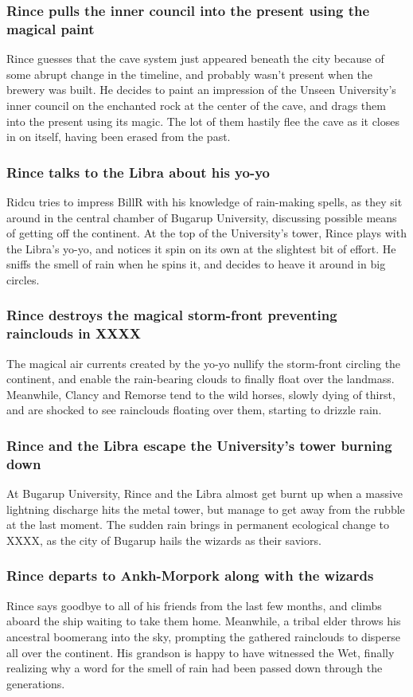 \subsubsection{\Gls{Rince} pulls the inner council into the present using the magical paint}
\Gls{Rince} guesses that the cave system just appeared beneath the city because of some abrupt
change in the timeline, and probably wasn't present when the brewery was built. He decides to paint
an impression of the Unseen University's inner council on the enchanted rock at the center of the
cave, and drags them into the present using its magic. The lot of them hastily flee the cave as it
closes in on itself, having been erased from the past.

\subsubsection{\Gls{Rince} talks to the \Gls{Libra} about his yo-yo}
\Gls{Ridcu} tries to impress \Gls{BillR} with his knowledge of rain-making spells, as they sit
around in the central chamber of Bugarup University, discussing possible means of getting off the
continent. At the top of the University's tower, \Gls{Rince} plays with the \Gls{Libra}'s yo-yo,
and notices it spin on its own at the slightest bit of effort. He sniffs the smell of rain when he
spins it, and decides to heave it around in big circles.

\subsubsection{\Gls{Rince} destroys the magical storm-front preventing rainclouds in XXXX}
The magical air currents created by the yo-yo nullify the storm-front circling the continent, and
enable the rain-bearing clouds to finally float over the landmass. Meanwhile, \Gls{Clancy} and
\Gls{Remorse} tend to the wild horses, slowly dying of thirst, and are shocked to see rainclouds
floating over them, starting to drizzle rain.

\subsubsection{\Gls{Rince} and the \Gls{Libra} escape the University's tower burning down}
At Bugarup University, \Gls{Rince} and the \Gls{Libra} almost get burnt up when a massive lightning
discharge hits the metal tower, but manage to get away from the rubble at the last moment. The
sudden rain brings in permanent ecological change to XXXX, as the city of Bugarup hails the wizards
as their saviors.

\subsubsection{\Gls{Rince} departs to Ankh-Morpork along with the wizards}
\Gls{Rince} says goodbye to all of his friends from the last few months, and climbs aboard the
ship waiting to take them home. Meanwhile, a tribal elder throws his ancestral boomerang into the
sky, prompting the gathered rainclouds to disperse all over the continent. His grandson is happy to
have witnessed the Wet, finally realizing why a word for the smell of rain had been passed down
through the generations.